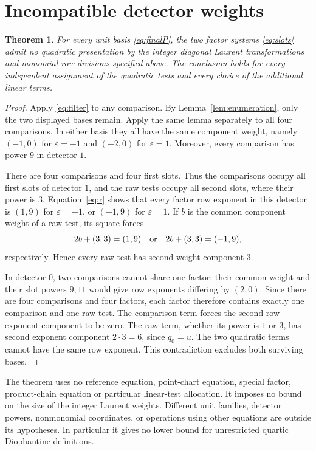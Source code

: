 \documentclass[11pt,a4paper]{article}
\newtheorem{theorem}{Theorem}[section]
\begin{document}
\section{Incompatible detector weights}

\begin{theorem}\label{thm:obstruction}
For every unit basis \eqref{eq:finalP}, the two factor systems
\eqref{eq:slots} admit no quadratic presentation by the integer
diagonal Laurent transformations and monomial row divisions specified
above. The conclusion holds for every independent assignment of the
quadratic tests and every choice of the additional linear terms.
\end{theorem}
\begin{proof}
Apply \eqref{eq:filter} to any comparison. By
Lemma~\ref{lem:enumeration}, only the two displayed bases remain.
Apply the same lemma separately to all four comparisons. In either
basis they all have the same component weight, namely $(-1,0)$
for $\varepsilon=-1$ and $(-2,0)$ for $\varepsilon=1$.
Moreover, every comparison has power $9$ in detector $1$.

There are four comparisons and four first slots. Thus the comparisons
occupy all first slots of detector $1$, and the raw tests occupy all
second slots, where their power is $3$. Equation~\eqref{eq:r}
shows that every factor row exponent in this detector is $(1,9)$
for $\varepsilon=-1$, or $(-1,9)$ for $\varepsilon=1$.
If $b$ is the common component weight of a raw test, its square
forces
\[
 2b+(3,3)=(1,9)\quad\hbox{or}\quad
 2b+(3,3)=(-1,9),
\]
respectively. Hence every raw test has second weight component $3$.

In detector $0$, two comparisons cannot share one factor: their
common weight and their slot powers $9,11$ would give row exponents
differing by $(2,0)$. Since there are four comparisons and four
factors, each factor therefore contains exactly one comparison and
one raw test. The comparison term forces the second row-exponent
component to be zero. The raw term, whether its power is $1$ or $3$,
has second exponent component $2\cdot3=6$, since $q_0=u$.
The two quadratic terms cannot have the same row exponent.
This contradiction excludes both surviving bases.
\end{proof}

The theorem uses no reference equation, point-chart equation, special
factor, product-chain equation or particular linear-test allocation.
It imposes no bound on the size of the integer Laurent weights.
Different unit families, detector powers, nonmonomial coordinates,
or operations using other equations are outside its hypotheses.
In particular it gives no lower bound for unrestricted quartic
Diophantine definitions.
\end{document}

